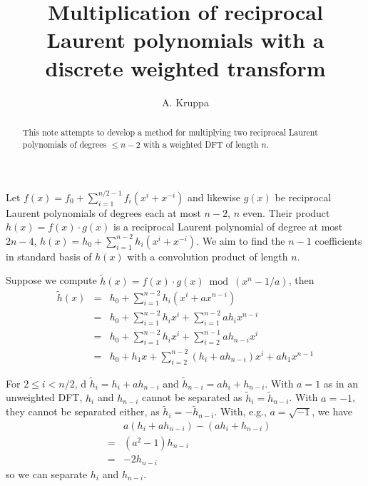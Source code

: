 \documentclass{article}
\begin{document}
\newcommand{\Z}{\mathbb{Z}}
\newcommand{\Zn}[1]{(\Z/{#1}\Z)^{*}}

\title{Multiplication of reciprocal Laurent polynomials with a discrete 
       weighted transform}
\author{A. Kruppa}
\maketitle

\begin{abstract}
This note attempts to develop a method for multiplying two reciprocal
Laurent polynomials of degrees $\leq n - 2$ with a weighted DFT of 
length $n$.
\end{abstract}

Let $f(x) = f_0 + \sum_{i=1}^{n/2-1} f_i (x^i + x^{-i})$ and likewise 
$g(x)$ be reciprocal Laurent polynomials of degrees each at most $n-2$, 
$n$ even.
Their product $h(x) = f(x) \cdot g(x)$ is a reciprocal Laurent polynomial 
of degree at most $2n-4$, 
$h(x) = h_0 + \sum_{i=1}^{n-2} h_i (x^i + x^{-i})$. We aim to find the
$n-1$ coefficients in standard basis of $h(x)$ with a convolution product
of length $n$.

Suppose we compute $\tilde{h}(x) = f(x) \cdot g(x) \bmod (x^n - 1/a)$, then
\begin{eqnarray*}
  \tilde{h}(x) & = & h_0 + \sum_{i=1}^{n-2} h_i (x^i + ax^{n-i}) \\
               & = & h_0 + \sum_{i=1}^{n-2} h_i x^i + \sum_{i=1}^{n-2} ah_i x^{n-i} \\
               & = & h_0 + \sum_{i=1}^{n-2} h_i x^i + \sum_{i=2}^{n-1} ah_{n-i} x^i \\
               & = & h_0 + h_1 x + \sum_{i=2}^{n-2} (h_i + ah_{n-i}) x^i + ah_1 x^{n-1}
\end{eqnarray*}

For $2 \leq i < n/2$, d $\tilde{h}_i = h_i + ah_{n-i}$ and 
$\tilde{h}_{n-i} = ah_i + h_{n-i}$. With $a=1$ as in an unweighted DFT,
$h_i$ and $h_{n-i}$ cannot be separated as $\tilde{h}_i = \tilde{h}_{n-i}$. 
With $a=-1$, they cannot be separated either, as 
$\tilde{h}_i = - \tilde{h}_{n-i}$. 
With, e.g., $a=\sqrt{-1}$, we have
\begin{eqnarray*}
 &   & a (h_i + ah_{n-i}) - (ah_i + h_{n-i}) \\
 & = & (a^2-1) h_{n-i} \\
 & = & -2 h_{n-i}
\end{eqnarray*}
so we can separate $h_i$ and $h_{n-i}$.
\end{document}
